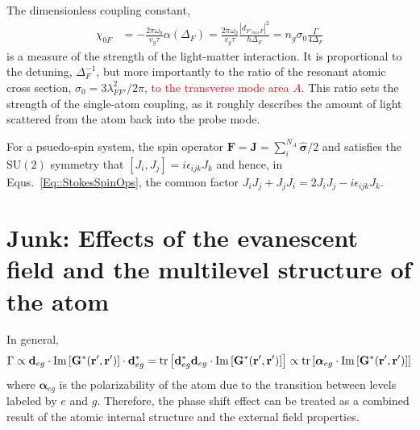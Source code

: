 \documentclass[preprint,aps,pra,onecolumn]{revtex4-1} %
\begin{document}
The dimensionless coupling constant,
\begin{align}
\chi_{0F} &= -\frac{2\pi\omega_0}{v_g\tau}\alpha(\Delta_F) =\frac{2\pi\omega_0}{v_g\tau} \frac{|d_{F'_{max}F}|^2}{\hbar \Delta_F} =n_g\sigma_0\frac{\Gamma}{4\Delta_F}
\end{align}
is a measure of the strength of the light-matter interaction.  It is proportional to the detuning, $\Delta_F^{-1}$, but more importantly to the ratio of the resonant atomic cross section, $\sigma_0 = 3 \lambda_{F F'}^2/2 \pi$, \textcolor{red}{to the transverse mode area $A$}.  This ratio sets the strength of the single-atom coupling, as it roughly describes the amount of light scattered from the atom back into the probe mode.  

For a psuedo-spin system, the spin operator 
$\mathbf{F}=\mathbf{J}=\sum_i^{N_A}\hat{\boldsymbol{\sigma}}/2$ and satisfies the $\mathrm{SU}(2)$ 
symmetry that $[J_i,J_j]=i\epsilon_{ijk}J_k$ and hence, in Equs.~\eqref{Eq::StokesSpinOps}, the common 
factor $J_iJ_j+J_jJ_i=2J_iJ_j-i\epsilon_{ijk}J_k$. 



\section{Junk: Effects of the evanescent field and the multilevel structure of the atom}
In general, 
\begin{align}
\Gamma \propto \mathbf{d}_{eg}\cdot \mathrm{Im}\left[\mathbf{G}^*(\mathbf{r}',\mathbf{r}') \right]\cdot\mathbf{d}_{eg}^*=\mathrm{tr}\left[\mathbf{d}_{eg}^*\mathbf{d}_{eg}\cdot \mathrm{Im}\left[\mathbf{G}^*(\mathbf{r}',\mathbf{r}') \right] \right]\propto \mathrm{tr}\left[\boldsymbol{\alpha}_{eg}\cdot \mathrm{Im}\left[\mathbf{G}^*(\mathbf{r}',\mathbf{r}') \right] \right]
\end{align}
where $ \boldsymbol{\alpha}_{eg} $ is the polarizability of the atom due to the transition between levels labeled by $ e$ and $g $. Therefore, the phase shift effect can be treated as a combined result of the atomic internal structure and the external field properties. 
\end{document}
